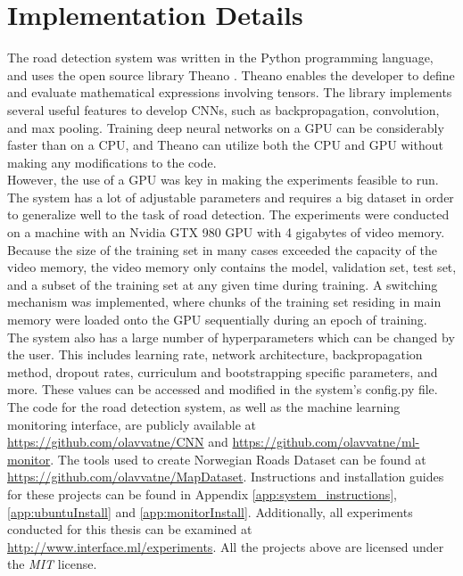 \section{Implementation Details}
\label{sec:methods_implementation_details}
The road detection system was written in the Python programming language, and uses the open source library Theano \citep{bergstra_theano}. Theano enables the developer to define and evaluate mathematical expressions involving tensors. The library implements several useful features to develop \ac{CNN}s, such as backpropagation, convolution, and max pooling. Training deep neural networks on a \ac{GPU} can be considerably faster than on a \ac{CPU}, and Theano can utilize both the \ac{CPU} and \ac{GPU} without making any modifications to the code.\\

However, the use of a \ac{GPU} was key in making the experiments feasible to run. The system has a lot of adjustable parameters and requires a big dataset in order to generalize well to the task of road detection. The experiments were conducted on a machine with an Nvidia GTX 980 \ac{GPU} with 4 gigabytes of video memory. \\

Because the size of the training set in many cases exceeded the capacity of the video memory, the video memory only contains the model, validation set, test set, and a subset of the training set at any given time during training. A switching mechanism was implemented, where chunks of the training set residing in main memory were loaded onto the \ac{GPU} sequentially during an epoch of training.\\

The system also has a large number of hyperparameters which can be changed by the user. This includes learning rate, network architecture, backpropagation method, dropout rates, curriculum and bootstrapping specific parameters, and more. These values can be accessed and modified in the system's config.py file. \\

The code for the road detection system, as well as the machine learning monitoring interface, are publicly available at 
\url{https://github.com/olavvatne/CNN} and \url{https://github.com/olavvatne/ml-monitor}. The tools used to create Norwegian Roads Dataset can be found at \url{https://github.com/olavvatne/MapDataset}. Instructions and installation guides for these projects can be found in Appendix \ref{app:system_instructions}, \ref{app:ubuntuInstall} and \ref{app:monitorInstall}. Additionally, all experiments conducted for this thesis can be examined at \url{http://www.interface.ml/experiments}. All the projects above are licensed under the \emph{MIT} license.

